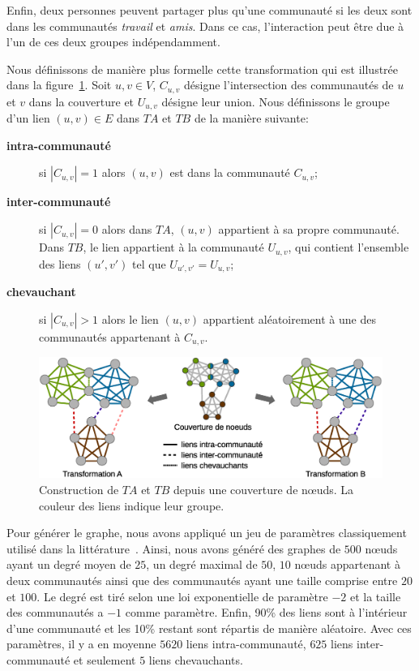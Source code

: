 Enfin, deux personnes peuvent partager plus qu'une communauté si les deux sont dans les communautés \emph{travail} et \emph{amis}.
Dans ce cas, l'interaction peut être due à l'un de ces deux groupes indépendamment.

Nous définissons de manière plus formelle cette transformation qui est illustrée dans la figure~\ref{fig:Trans}.
Soit $u,v \in V$, $C_{u,v}$ désigne l'intersection des communautés de $u$ et $v$ dans la couverture et $U_{u,v}$ désigne leur union.
Nous définissons le groupe d'un lien $(u,v) \in E$ dans $TA$ et $TB$ de la manière suivante:
\begin{description}
\item[\textbf{intra-communauté}] si $|C_{u,v}| = 1$ alors $(u,v)$ est dans la communauté $C_{u,v}$;
\item[\textbf{inter-communauté}] si $|C_{u,v}| = 0$ alors dans $TA$, $(u,v)$ appartient à sa propre communauté.
Dans $TB$, le lien appartient à la communauté $U_{u,v}$, qui contient l'ensemble des liens $(u',v')$ tel que $U_{u',v'}=U_{u,v}$;
\item[\textbf{chevauchant}] si $|C_{u,v}| > 1$ alors le lien $(u,v)$ appartient aléatoirement à une des communautés appartenant à $C_{u,v}$.
\end{description}

\begin{figure}
\centering
\includegraphics[width=0.9\linewidth]{img/ExpectedNodes/Example/GroundTruthTransformation}
\caption{Construction de $TA$ et $TB$ depuis une couverture de n\oe{}uds.
La couleur des liens indique leur groupe.}
\label{fig:Trans}
\end{figure}

Pour générer le graphe, nous avons appliqué un jeu de paramètres classiquement utilisé dans la littérature~\cite{Fortunato2010}.
Ainsi, nous avons généré des graphes de $500$ n\oe{}uds ayant un degré moyen de $25$, un degré maximal de $50$, $10$ n\oe{}uds appartenant à deux communautés ainsi que des communautés ayant une taille comprise entre $20$ et $100$.
Le degré est tiré selon une loi exponentielle de paramètre $-2$ et la taille des communautés a $-1$ comme paramètre.
Enfin, 90\% des liens sont à l'intérieur d'une communauté et les 10\% restant sont répartis de manière aléatoire.
Avec ces paramètres, il y a en moyenne $5620$ liens intra-communauté, $625$ liens inter-communauté et seulement $5$ liens chevauchants.

